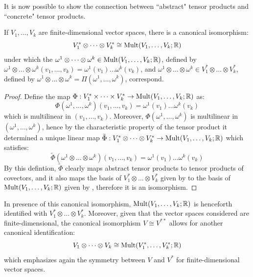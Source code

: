 It is now possible to show the connection between ``abstract" tensor products and ``concrete" tensor products.

\begin{lemma}{}{}
  If $ V_1 , \dots , V_k $ are finite-dimensional vector spaces, there is a canonical isomorphism:
  \begin{equation}
    V_1^* \otimes \dots \otimes V_k^* \cong \operatorname{Mult}(V_1 , \dots , V_k ; \mathbb{R})
  \end{equation}
  under which the $ \omega^1 \otimes \dots \otimes \omega^k \in \operatorname{Mult}(V_1 , \dots , V_k ; \mathbb{R}) $, defined by $ \omega^1 \otimes \dots \otimes \omega^k (v_1 , \dots , v_k) = \omega^1(v_1) \dots \omega^k(v_k) $, and $ \omega^1 \otimes \dots \otimes \omega^k \in V_1^* \otimes \dots \otimes V_k^* $, defined by $ \omega^1 \otimes \dots \otimes \omega^k = \Pi(\omega^1 , \dots , \omega^k) $, correspond.
\end{lemma}

\begin{proofbox}
  \begin{proof}
    Define the map $ \Phi : V_1^* \times \dots \times V_k^* \rightarrow \operatorname{Mult}(V_1 , \dots , V_k ; \mathbb{R}) $ as:
    \begin{equation*}
      \Phi(\omega^1 , \dots , \omega^k)(v_1 , \dots , v_k) = \omega^1(v_1) \dots \omega^k(v_k)
    \end{equation*}
    which is multilinear in $ (v_1 , \dots , v_k) $. Moreover, $ \Phi(\omega^1 , \dots , \omega^k) $ is multilinear in $ (\omega^1 , \dots , \omega^k) $, hence by the characteristic property of the tensor product it determined a unique linear map $ \tilde{\Phi} : V_1^* \otimes \dots \otimes V_k^* \rightarrow \operatorname{Mult}(V_1 , \dots , V_k ; \mathbb{R}) $ which satisfies:
    \begin{equation*}
      \tilde{\Phi}(\omega^1 \otimes \dots \otimes \omega^k)(v_1 , \dots , v_k) = \omega^1(v_1) \dots \omega^k(v_k)
    \end{equation*}
    By this defintion, $ \tilde{\Phi} $ clearly maps abstract tensor products to tensor products of covectors, and it also maps the basis of $ V_1^* \otimes \dots \otimes V_k^* $ given by  to the basis of $ \operatorname{Mult}(V_1 , \dots , V_k ; \mathbb{R}) $ given by , therefore it is an isomorphism.
  \end{proof}
\end{proofbox}

In presence of this canonical isomorphism, $ \operatorname{Mult}(V_1 , \dots , V_k ; \mathbb{R}) $ is henceforth identified with $ V_1^* \otimes \dots \otimes V_k^* $. Moreover, given that the vector spaces considered are finite-dimensional, the canonical isomorphism $ V \cong V^{**} $ allows for another canonical identification:
\begin{equation}
  V_1 \otimes \dots \otimes V_k \cong \operatorname{Mult}(V_1^* , \dots , V_k^* ; \mathbb{R})
\end{equation}
which emphasizes again the symmetry between $ V $ and $ V^* $ for finite-dimensional vector spaces.

